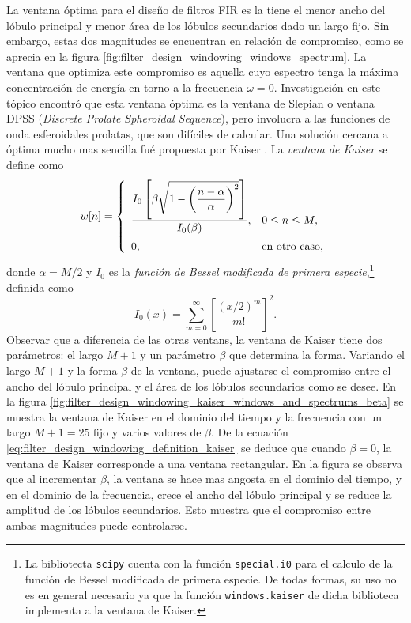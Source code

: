 \documentclass[a4paper]{report}
\begin{document}
La ventana óptima para el diseño de filtros FIR es la tiene el menor ancho del lóbulo principal y menor área de los lóbulos secundarios dado un largo fijo. Sin embargo, estas dos magnitudes se encuentran en relación de compromiso, como se aprecia en la figura \ref{fig:filter_design_windowing_windows_spectrum}. La ventana que optimiza este compromiso es aquella cuyo espectro tenga la máxima concentración de energía en torno a la frecuencia \(\omega=0\). Investigación en este tópico encontró que esta ventana óptima es la ventana de Slepian o ventana DPSS (\emph{Discrete Prolate Spheroidal Sequence}), pero involucra a las funciones de onda esferoidales prolatas, que son difíciles de calcular. Una solución cercana a óptima mucho mas sencilla fué propuesta por Kaiser \cite{kaiser1980use}. La \emph{ventana de Kaiser} se define como
\begin{equation}\label{eq:filter_design_windowing_definition_kaiser}
 w[n]=\left\{ 
   \begin{array}{ll}
     \dfrac{I_0\left[\beta\sqrt{1-\left(\dfrac{n-\alpha}{\alpha}\right)^2}\right]}{I_0(\beta)}, & 0\leq n\leq M,\\[\bigskipamount] 
     0, & \textrm{en otro caso,}
   \end{array}
 \right. 
\end{equation}
donde \(\alpha=M/2\) y \(I_0\) es la \emph{función de Bessel modificada de primera especie},\footnote{La bibliotecta \texttt{scipy} cuenta con la función \texttt{special.i0} para el calculo de la función de Bessel modificada de primera especie. De todas formas, su uso no es en general necesario ya que la función \texttt{windows.kaiser} de dicha biblioteca implementa a la ventana de Kaiser.} definida como
\[
 I_0(x)=\sum_{m=0}^\infty\left[\dfrac{\left(x/2\right)^m}{m!}\right]^2.
\]
Observar que a diferencia de las otras ventans, la ventana de Kaiser tiene dos parámetros: el largo \(M+1\) y un parámetro \(\beta\) que determina la forma. Variando el largo \(M+1\) y la forma \(\beta\) de la ventana, puede ajustarse el compromiso entre el ancho del lóbulo principal y el área de los lóbulos secundarios como se desee. En la figura \ref{fig:filter_design_windowing_kaiser_windows_and_spectrums_beta} se muestra la ventana de Kaiser en el dominio del tiempo y la frecuencia con un largo \(M+1=25\) fijo y varios valores de \(\beta\). De la ecuación \ref{eq:filter_design_windowing_definition_kaiser} se deduce que cuando \(\beta=0\), la ventana de Kaiser corresponde a una ventana rectangular. En la figura se observa que al incrementar \(\beta\), la ventana se hace mas angosta en el dominio del tiempo, y en el dominio de la frecuencia, crece el ancho del lóbulo principal y se reduce la amplitud de los lóbulos secundarios. Esto muestra que el compromiso entre ambas magnitudes puede controlarse.
\end{document}
